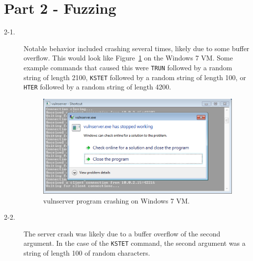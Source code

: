 \documentclass[11pt]{article}
\begin{document}
\section*{Part 2 - Fuzzing}
\begin{description}
  \item[2-1.] Notable behavior included crashing several times, likely due to some buffer overflow. This would look like
    Figure~\ref{fig:crash} on the Windows 7 VM. Some example commands that caused this were \verb|TRUN| followed by a random
    string of length 2100, \verb|KSTET| followed by a random string of length 100, or \verb|HTER| followed by a random string
    of length 4200.
    \begin{figure}[htbp]
      \centering
      \includegraphics[width=1\linewidth]{./crash.png}
      \caption{vulnserver program crashing on Windows 7 VM.}
      \label{fig:crash}
    \end{figure}
  \item[2-2.] The server crash was likely due to a buffer overflow of the second argument. In the case of the \verb|KSTET|
    command, the second argument was a string of length 100 of random characters.
\end{description}
\end{document}
